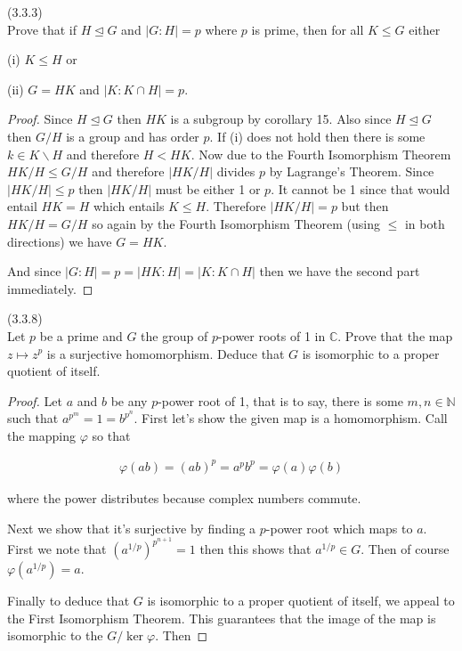 \documentclass{exam}
\begin{document}
\begin{questions}
\question(3.3.3)\\
Prove that if $H\trianglelefteq G$ and $|G:H| = p$ where $p$ is prime, then for all $K\leq G$ either

(i) $K\leq H$ or

(ii) $G=HK$ and $|K:K\cap H|=p$.

\begin{proof}
  Since $H\trianglelefteq G$ then $HK$ is a subgroup by corollary 15.  Also since $H\trianglelefteq G$ then $G/H$ is a group and has order $p$.  If (i) does not hold then there is some $k\in K\smallsetminus H$ and therefore $H < HK$.  Now due to the Fourth Isomorphism Theorem $HK/H \leq G/H$ and therefore $|HK/H|$ divides $p$ by Lagrange's Theorem.  Since $|HK/H|\leq p$ then $|HK/H|$ must be either 1 or $p$.  It cannot be 1 since that would entail $HK = H$ which entails $K\leq H$.  Therefore $|HK/H|=p$ but then $HK/H=G/H$ so again by the Fourth Isomorphism Theorem (using $\leq$ in both directions) we have $G=HK$.

  And since $|G:H|=p=|HK:H|=|K:K\cap H|$ then we have the second part immediately.
\end{proof}

\question(3.3.8)\\
Let $p$ be a prime and $G$ the group of $p$-power roots of 1 in $\mathbb C$.  Prove that the map $z\mapsto z^p$ is a surjective homomorphism.  Deduce that $G$ is isomorphic to a proper quotient of itself.

\begin{proof}
  Let $a$ and $b$ be any $p$-power root of 1, that is to say, there is some $m,n\in \mathbb N$ such that $a^{p^m}=1=b^{p^n}$.  First let's show the given map is a homomorphism.  Call the mapping $\varphi$ so that

  \begin{align*}
    \varphi(ab) = (ab)^p = a^pb^p = \varphi(a)\varphi(b)
  \end{align*}

  where the power distributes because complex numbers commute.

  Next we show that it's surjective by finding a $p$-power root which maps to $a$.  First we note that $(a^{1/p})^{p^{n+1}}=1$ then this shows that $a^{1/p}\in G$.  Then of course $\varphi(a^{1/p})=a$.

  Finally to deduce that $G$ is isomorphic to a proper quotient of itself, we appeal to the First Isomorphism Theorem.  This guarantees that the image of the map is isomorphic to the $G/\ker\varphi$.  Then


\end{proof}
\end{questions}
\end{document}
